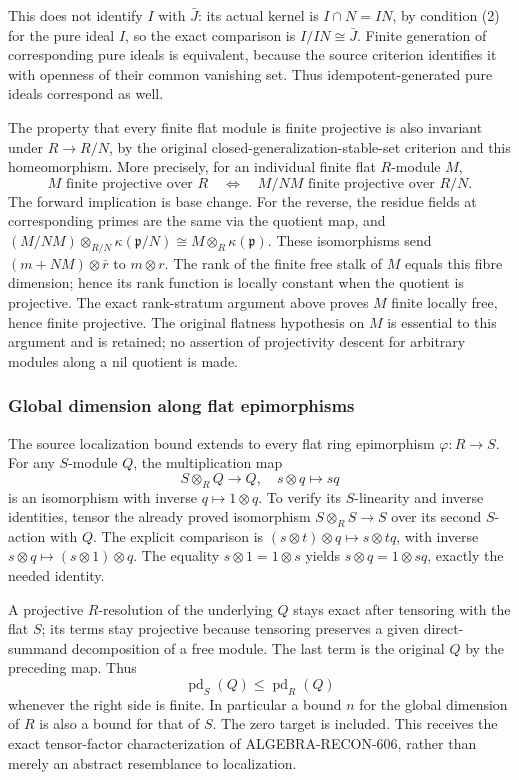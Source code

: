 This does not identify \(I\) with \(\bar J\): its actual kernel is \(I\cap N=IN\), by condition (2) for the pure ideal \(I\), so the exact comparison is \(I/IN\cong\bar J\). Finite generation of corresponding pure ideals is equivalent, because the source criterion identifies it with openness of their common vanishing set. Thus idempotent-generated pure ideals correspond as well.

The property that every finite flat module is finite projective is also invariant under \(R\to R/N\), by the original closed-generalization-stable-set criterion and this homeomorphism. More precisely, for an individual finite flat \(R\)-module \(M\), \[
M\text{ finite projective over }R
\quad\Longleftrightarrow\quad
M/NM\text{ finite projective over }R/N .
\] The forward implication is base change. For the reverse, the residue fields at corresponding primes are the same via the quotient map, and \((M/NM)\otimes_{R/N}\kappa(\mathfrak p/N)
\cong M\otimes_R\kappa(\mathfrak p)\). These isomorphisms send \((m+NM)\otimes\bar r\) to \(m\otimes r\). The rank of the finite free stalk of \(M\) equals this fibre dimension; hence its rank function is locally constant when the quotient is projective. The exact rank-stratum argument above proves \(M\) finite locally free, hence finite projective. The original flatness hypothesis on \(M\) is essential to this argument and is retained; no assertion of projectivity descent for arbitrary modules along a nil quotient is made.

\subsubsection{Global dimension along flat epimorphisms}\label{algebra-proof-022-global-dimension-along-flat-epimorphisms}

The source localization bound extends to every flat ring epimorphism \(\varphi:R\to S\). For any \(S\)-module \(Q\), the multiplication map \[
S\otimes_RQ\longrightarrow Q,\quad s\otimes q\mapsto sq
\] is an isomorphism with inverse \(q\mapsto1\otimes q\). To verify its \(S\)-linearity and inverse identities, tensor the already proved isomorphism \(S\otimes_RS\to S\) over its second \(S\)-action with \(Q\). The explicit comparison is \((s\otimes t)\otimes q\mapsto s\otimes tq\), with inverse \(s\otimes q\mapsto(s\otimes1)\otimes q\). The equality \(s\otimes1=1\otimes s\) yields \(s\otimes q=1\otimes sq\), exactly the needed identity.

A projective \(R\)-resolution of the underlying \(Q\) stays exact after tensoring with the flat \(S\); its terms stay projective because tensoring preserves a given direct-summand decomposition of a free module. The last term is the original \(Q\) by the preceding map. Thus \[
\operatorname{pd}_S(Q)\le\operatorname{pd}_R(Q)
\] whenever the right side is finite. In particular a bound \(n\) for the global dimension of \(R\) is also a bound for that of \(S\). The zero target is included. This receives the exact tensor-factor characterization of ALGEBRA-RECON-606, rather than merely an abstract resemblance to localization.

